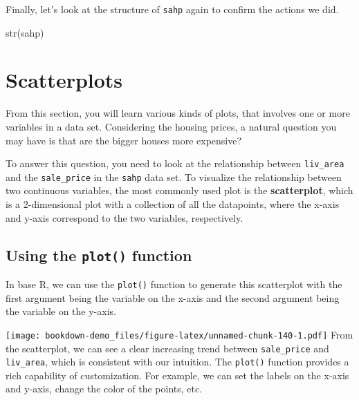 \documentclass[
]{book}
\newenvironment{Shaded}{\begin{snugshade}}{\end{snugshade}}
\newcommand{\FunctionTok}[1]{\textcolor[rgb]{0.00,0.00,0.00}{#1}}
\newcommand{\NormalTok}[1]{#1}
\newcommand{\SpecialCharTok}[1]{\textcolor[rgb]{0.00,0.00,0.00}{#1}}
\begin{document}
Finally, let's look at the structure of \texttt{sahp} again to confirm the actions we did.

\begin{Shaded}
\begin{Highlighting}[]
\FunctionTok{str}\NormalTok{(sahp)}
\end{Highlighting}
\end{Shaded}

\hypertarget{scatterplots}{%
\section{Scatterplots}\label{scatterplots}}

From this section, you will learn various kinds of plots, that involves one or more variables in a data set. Considering the housing prices, a natural question you may have is that are the bigger houses more expensive?

To answer this question, you need to look at the relationship between \texttt{liv\_area} and the \texttt{sale\_price} in the \texttt{sahp} data set.
To visualize the relationship between two continuous variables, the most commonly used plot is the \textbf{scatterplot}, which is a 2-dimensional plot with a collection of all the datapoints, where the x-axis and y-axis correspond to the two variables, respectively.

\hypertarget{using-the-plot-function}{%
\subsection{\texorpdfstring{Using the \texttt{plot()} function}{Using the plot() function}}\label{using-the-plot-function}}

In base R, we can use the \texttt{plot()} function to generate this scatterplot with the first argument being the variable on the x-axis and the second argument being the variable on the y-axis.

\begin{Shaded}
\end{Shaded}

\texttt{[image: bookdown-demo\_files/figure-latex/unnamed-chunk-140-1.pdf]}
From the scatterplot, we can see a clear increasing trend between \texttt{sale\_price} and \texttt{liv\_area}, which is consistent with our intuition. The \texttt{plot()} function provides a rich capability of customization. For example, we can set the labels on the x-axis and y-axis, change the color of the points, etc.
\end{document}
